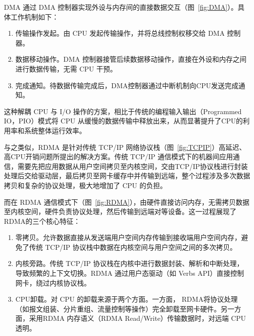 {DMA 通过 DMA 控制器实现外设与内存间的直接数据交互（图~\ref{fig:DMA}）。具体工作机制如下：
\begin{enumerate}[label=\arabic*.]
    \item 传输操作发起。由 CPU 发起传输操作，并将总线控制权移交给 DMA 控制器。
    \item 数据移动操作。DMA 控制器接管后续数据移动操作，直接在外设和内存之间进行数据传输，无需 CPU 干预。
    \item 完成通知。待数据传输完成后，DMA控制器通过中断机制向CPU发送完成通知。
\end{enumerate}
这种解耦 CPU 与 I/O 操作的方案，相比于传统的编程输入输出（Programmed IO，PIO）模式将 CPU 从缓慢的数据传输中释放出来，从而显著提升了CPU的利用率和系统整体运行效率。

与之类似，RDMA 是针对传统 TCP/IP 网络协议栈（图~\ref{fig:TCPIP}）高延迟、高CPU开销问题所提出的解决方案。传统 TCP/IP 通信模式下的机器间应用通信，需要先把应用数据从用户空间拷贝至内核空间，交由TCP/IP协议栈进行封装处理后交给驱动层，最后拷贝至网卡缓存中并传输到远端，整个过程涉及多次数据拷贝和复杂的协议处理，极大地增加了 CPU 的负担。

而在 RDMA 通信模式下（图~\ref{fig:RDMA}），由硬件直接访问内存，无需拷贝数据至内核空间，硬件负责协议处理，然后传输到远端对等设备。这一过程展现了RDMA的三个核心特征：
\begin{enumerate}[label=\arabic*.]
    \item 零拷贝。允许数据直接从发送端用户空间内存传输到接收端用户空间内存，避免了传统 TCP/IP 协议栈中数据在内核空间与用户空间之间的多次拷贝。
    \item 内核旁路。传统 TCP/IP 协议栈在内核中进行数据封装、解析和中断处理，导致频繁的上下文切换。RDMA 通过用户态驱动（如 Verbs API）直接控制网卡，绕过内核协议栈。
    \item CPU卸载。对 CPU 的卸载来源于两个方面。一方面， RDMA将协议处理（如报文组装、分片重组、流量控制等操作）完全卸载至网卡硬件。另一方面，采用RDMA 内存语义（RDMA Read/Write）传输数据时，对远端 CPU 透明。
\end{enumerate}

}
